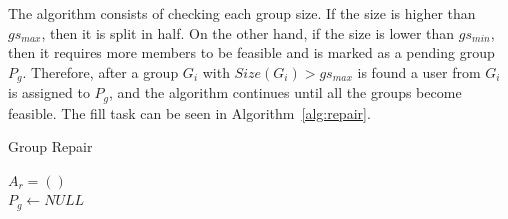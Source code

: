 The algorithm consists of checking each group size. If the size is higher than $gs_{max}$, then it is split in half. On the other hand, if the size is lower than $gs_{min}$, then it requires more members to be feasible and is marked as a pending group $P_g$.  Therefore, after a group $G_i$ with $Size(G_i) > gs_{max}$ is found a user from $G_i$ is assigned to $P_g$, and the algorithm continues until all the groups become feasible.
The fill task can be seen in Algorithm~\ref{alg:repair}.\\

\begin{algorithm}[H]
    \caption{Group Repair}
    \label{alg:repair}
    \SetAlgoLined 
    $A_r = ()$\;\\
    $P_g \leftarrow NULL$\;\\
\end{algorithm}


